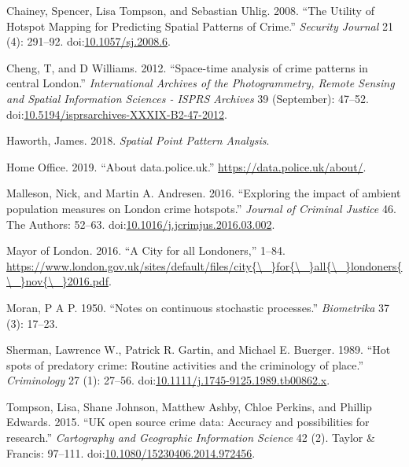 \documentclass[]{article}
\theoremstyle{definition}
\theoremstyle{definition}
\theoremstyle{definition}
\theoremstyle{remark}
\begin{document}
\hypertarget{ref-Chainey2008}{}
Chainey, Spencer, Lisa Tompson, and Sebastian Uhlig. 2008. ``The Utility
of Hotspot Mapping for Predicting Spatial Patterns of Crime.''
\emph{Security Journal} 21 (4): 291--92.
doi:\href{https://doi.org/10.1057/sj.2008.6}{10.1057/sj.2008.6}.

\hypertarget{ref-Cheng2012}{}
Cheng, T, and D Williams. 2012. ``Space-time analysis of crime patterns
in central London.'' \emph{International Archives of the Photogrammetry,
Remote Sensing and Spatial Information Sciences - ISPRS Archives} 39
(September): 47--52.
doi:\href{https://doi.org/10.5194/isprsarchives-XXXIX-B2-47-2012}{10.5194/isprsarchives-XXXIX-B2-47-2012}.

\hypertarget{ref-Haworth2018}{}
Haworth, James. 2018. \emph{Spatial Point Pattern Analysis}.

\hypertarget{ref-Office2019}{}
Home Office. 2019. ``About data.police.uk.''
\url{https://data.police.uk/about/}.

\hypertarget{ref-Malleson2016}{}
Malleson, Nick, and Martin A. Andresen. 2016. ``Exploring the impact of
ambient population measures on London crime hotspots.'' \emph{Journal of
Criminal Justice} 46. The Authors: 52--63.
doi:\href{https://doi.org/10.1016/j.jcrimjus.2016.03.002}{10.1016/j.jcrimjus.2016.03.002}.

\hypertarget{ref-MayorofLondon2016}{}
Mayor of London. 2016. ``A City for all Londoners,'' 1--84.
\href{https://www.london.gov.uk/sites/default/files/city\%7B/_\%7Dfor\%7B/_\%7Dall\%7B/_\%7Dlondoners\%7B/_\%7Dnov\%7B/_\%7D2016.pdf}{https://www.london.gov.uk/sites/default/files/city\{\textbackslash{}\_\}for\{\textbackslash{}\_\}all\{\textbackslash{}\_\}londoners\{\textbackslash{}\_\}nov\{\textbackslash{}\_\}2016.pdf}.

\hypertarget{ref-Moran1950}{}
Moran, P A P. 1950. ``Notes on continuous stochastic processes.''
\emph{Biometrika} 37 (3): 17--23.

\hypertarget{ref-Sherman1989}{}
Sherman, Lawrence W., Patrick R. Gartin, and Michael E. Buerger. 1989.
``Hot spots of predatory crime: Routine activities and the criminology
of place.'' \emph{Criminology} 27 (1): 27--56.
doi:\href{https://doi.org/10.1111/j.1745-9125.1989.tb00862.x}{10.1111/j.1745-9125.1989.tb00862.x}.

\hypertarget{ref-Tompson2015}{}
Tompson, Lisa, Shane Johnson, Matthew Ashby, Chloe Perkins, and Phillip
Edwards. 2015. ``UK open source crime data: Accuracy and possibilities
for research.'' \emph{Cartography and Geographic Information Science} 42
(2). Taylor \& Francis: 97--111.
doi:\href{https://doi.org/10.1080/15230406.2014.972456}{10.1080/15230406.2014.972456}.
\end{document}
